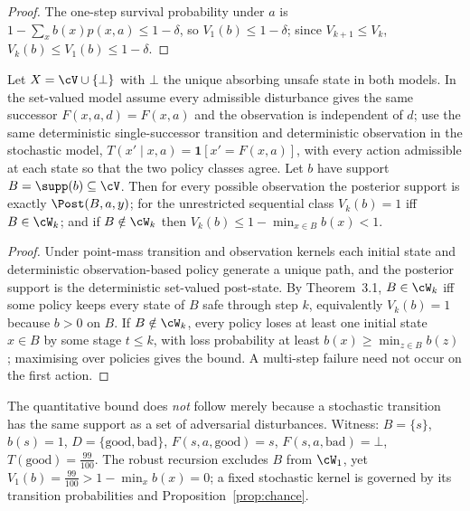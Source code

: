 \begin{proof}
The one-step survival probability under $a$ is $1-\sum_xb(x)p(x,a)\le1-\delta$, so $V_1(b)\le1-\delta$; since $V_{k+1}\le V_k$, $V_k(b)\le V_1(b)\le1-\delta$.
\end{proof}

\begin{proposition}\label{prop:degenerate}
Let $X=\cV\cup\{\bot\}$ with $\bot$ the unique absorbing unsafe state in both models. In the set-valued model assume every admissible disturbance gives the same successor $F(x,a,d)=F(x,a)$ and the observation is independent of $d$; use the same deterministic single-successor transition and deterministic observation in the stochastic model, $T(x'\mid x,a)=\mathbf 1[x'=F(x,a)]$, with every action admissible at each state so that the two policy classes agree. Let $b$ have support $B=\supp(b)\subseteq\cV$. Then for every possible observation the posterior support is exactly $\Post(B,a,y)$; for the unrestricted sequential class $V_k(b)=1$ iff $B\in\cW_k$; and if $B\notin\cW_k$ then $V_k(b)\le1-\min_{x\in B}b(x)<1$.
\end{proposition}

\begin{proof}
Under point-mass transition and observation kernels each initial state and deterministic observation-based policy generate a unique path, and the posterior support is the deterministic set-valued post-state. By Theorem~3.1, $B\in\cW_k$ iff some policy keeps every state of $B$ safe through step $k$, equivalently $V_k(b)=1$ because $b>0$ on $B$. If $B\notin\cW_k$, every policy loses at least one initial state $x\in B$ by some stage $t\le k$, with loss probability at least $b(x)\ge\min_{z\in B}b(z)$; maximising over policies gives the bound. A multi-step failure need not occur on the first action.
\end{proof}

The quantitative bound does \emph{not} follow merely because a stochastic transition has the same support as a set of adversarial disturbances. Witness: $B=\{s\}$, $b(s)=1$, $D=\{\text{good},\text{bad}\}$, $F(s,a,\text{good})=s$, $F(s,a,\text{bad})=\bot$, $T(\text{good})=\tfrac{99}{100}$. The robust recursion excludes $B$ from $\cW_1$, yet $V_1(b)=\tfrac{99}{100}>1-\min_xb(x)=0$; a fixed stochastic kernel is governed by its transition probabilities and Proposition~\ref{prop:chance}.

